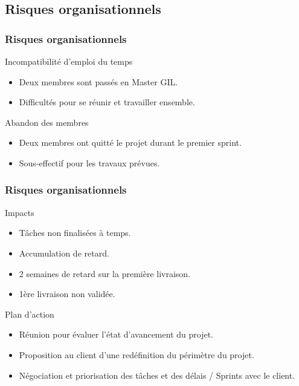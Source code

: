   \subsection{Risques organisationnels}
    \begin{frame}
      \frametitle{\color{white}Risques organisationnels}
      \begin{block}{Incompatibilité d'emploi du temps}
	\begin{itemize}
	  \item Deux membres sont passés en Master GIL.
	  \item Difficultés pour se réunir et travailler ensemble.
	\end{itemize}
      \end{block}
      \begin{block}{Abandon des membres}
	\begin{itemize}
	  \item Deux membres ont quitté le projet durant le premier sprint.
	  \item Sous-effectif pour les travaux prévues.
	\end{itemize}
      \end{block}
    \end{frame}
    
    \begin{frame}
      \frametitle{\color{white}Risques organisationnels}
      \begin{alertblock}{Impacts}
	\begin{itemize}
	 \item Tâches non finalisées à temps.
	 \item Accumulation de retard.
	 \item 2 semaines de retard sur la première livraison.
	 \item 1ère livraison non validée.
	\end{itemize}
      \end{alertblock}
 
      \begin{exampleblock}{Plan d'action}
        \begin{itemize}
          \item Réunion pour évaluer l'état d'avancement du projet.
          \item Proposition au client d'une redéfinition du périmètre du projet.
          \item Négociation et priorisation des tâches et des délais / Sprints avec le client.
        \end{itemize}
      \end{exampleblock}
    \end{frame}

